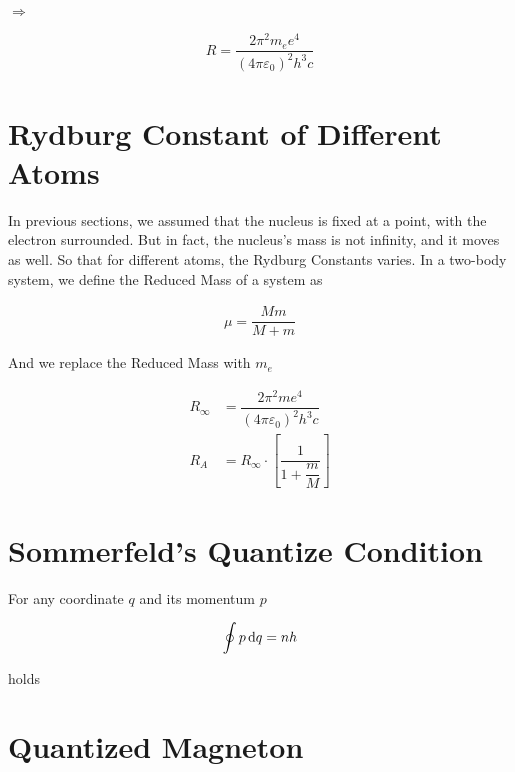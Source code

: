 $\Rightarrow$

\begin{equation*}
  \begin{aligned}
    R = \dfrac{2 \pi^2 m_e e^4}{\left( 4 \pi \varepsilon_0 \right)^2 h^3 c}
  \end{aligned}
\end{equation*}

\section{Rydburg Constant of Different Atoms}

In previous sections, we assumed that the nucleus is fixed at a point, with the electron surrounded. But in fact, the nucleus's mass is not infinity, and it moves as well. So that for different atoms, the Rydburg Constants varies. In a two-body system, we define the Reduced Mass of a system as

\begin{equation*}
  \begin{aligned}
    \mu = \dfrac{Mm}{M + m} 
  \end{aligned}
\end{equation*}

And we replace the Reduced Mass with $m_e$

\begin{equation}
  \begin{aligned}
    R_{\infty} &= \dfrac{2 \pi^2 m e^4}{\left( 4 \pi \varepsilon_0 \right)^2 h^3 c} \\
    R_A &= R_{\infty} \cdot \left[ \dfrac{1}{1 + \dfrac{m}{M} } \right]
  \end{aligned}
\end{equation}

\section{Sommerfeld's Quantize Condition}

For any coordinate $q$ and its momentum $p$

\begin{equation*}
  \begin{aligned}
    \oint p \mathop{}\!\mathrm{d} q = n h
  \end{aligned}
\end{equation*}

holds

\section{Quantized Magneton}

